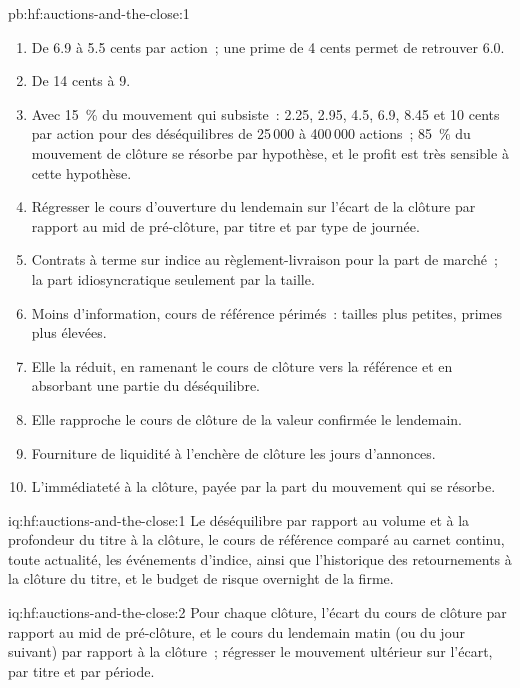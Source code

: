 \begin{solution}{pb:hf:auctions-and-the-close:1}
\begin{enumerate}
\item De 6.9 à 5.5 cents par action~; une prime de 4 cents permet de retrouver 6.0.
\item De 14 cents à 9.
\item Avec 15~\% du mouvement qui subsiste~: 2.25, 2.95, 4.5, 6.9, 8.45 et 10 cents par action pour des déséquilibres de 25\,000 à 400\,000 actions~; 85~\% du
mouvement de clôture se résorbe par hypothèse, et le profit est très sensible à cette hypothèse.
\item Régresser le cours d'ouverture du lendemain sur l'écart de la clôture par rapport au mid de pré-clôture, par titre et par type de journée.
\item Contrats à terme sur indice au règlement-livraison pour la part de marché~; la part idiosyncratique seulement par la taille.
\item Moins d'information, cours de référence périmés~: tailles plus petites, primes plus élevées.
\item Elle la réduit, en ramenant le cours de clôture vers la référence et en absorbant une partie du déséquilibre.
\item Elle rapproche le cours de clôture de la valeur confirmée le lendemain.
\item Fourniture de liquidité à l'enchère de clôture les jours d'annonces.
\item L'immédiateté à la clôture, payée par la part du mouvement qui se résorbe.
\end{enumerate}
\end{solution}

\begin{solution}{iq:hf:auctions-and-the-close:1}
Le déséquilibre par rapport au volume et à la profondeur du titre à la clôture, le cours de référence comparé au carnet continu, toute actualité, les événements d'indice, ainsi que
l'historique des retournements à la clôture du titre, et le budget de risque overnight de la firme.
\end{solution}

\begin{solution}{iq:hf:auctions-and-the-close:2}
Pour chaque clôture, l'écart du cours de clôture par rapport au mid de pré-clôture, et le cours du lendemain matin (ou du jour suivant) par rapport à la clôture~; régresser
le mouvement ultérieur sur l'écart, par titre et par période.
\end{solution}

